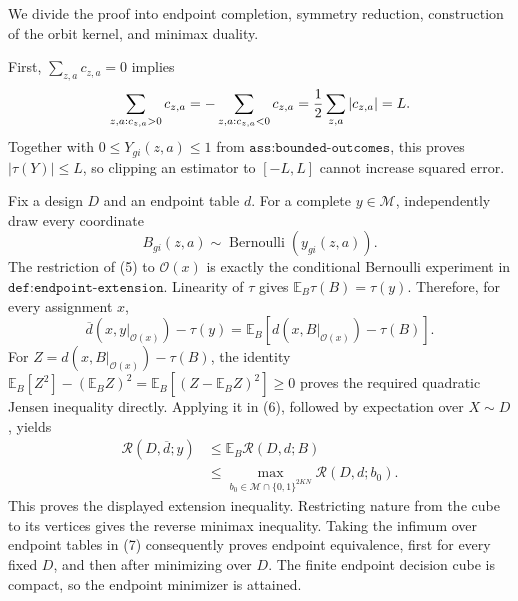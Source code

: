 We divide the proof into endpoint completion, symmetry reduction, construction of the orbit kernel, and minimax duality.

First, \(\sum_{z,a}c_{z,a}=0\) implies
\[
 \sum_{z,a:c_{z,a}>0}c_{z,a}
 =-\sum_{z,a:c_{z,a}<0}c_{z,a}
 ={1\over2}\sum_{z,a}|c_{z,a}|=L.
\]
Together with \(0\le Y_{gi}(z,a)\le1\) from \(\texttt{ass:bounded-outcomes}\), this proves \(|\tau(Y)|\le L\), so clipping an estimator to \([-L,L]\) cannot increase squared error.

Fix a design \(D\) and an endpoint table \(d\).  For a complete \(y\in\mathcal M\), independently draw every coordinate
\[
 B_{gi}(z,a)\sim\operatorname{Bernoulli}(y_{gi}(z,a)).                       \tag{5}
\]
The restriction of (5) to \(\mathcal O(x)\) is exactly the conditional Bernoulli experiment in \(\texttt{def:endpoint-extension}\).  Linearity of \(\tau\) gives \(\mathbb E_B\tau(B)=\tau(y)\).  Therefore, for every assignment \(x\),
\[
 \overline d(x,y|_{\mathcal O(x)})-\tau(y)
 =\mathbb E_B\!\left[d(x,B|_{\mathcal O(x)})-\tau(B)\right].             \tag{6}
\]
For \(Z=d(x,B|_{\mathcal O(x)})-\tau(B)\), the identity
\(\mathbb E_B[Z^2]-(\mathbb E_B Z)^2
=\mathbb E_B[(Z-\mathbb E_B Z)^2]\ge0\) proves the required quadratic Jensen
inequality directly.  Applying it in (6), followed by expectation over
\(X\sim D\), yields
\[
\begin{aligned}
 \mathcal R(D,\overline d;y)
 &\le \mathbb E_B\mathcal R(D,d;B)\\
 &\le \max_{b_0\in\mathcal M\cap\{0,1\}^{2KN}}
            \mathcal R(D,d;b_0).
\end{aligned}                                                               \tag{7}
\]
This proves the displayed extension inequality.  Restricting nature from the cube to its vertices gives the reverse minimax inequality.  Taking the infimum over endpoint tables in (7) consequently proves endpoint equivalence, first for every fixed \(D\), and then after minimizing over \(D\).  The finite endpoint decision cube is compact, so the endpoint minimizer is attained.

